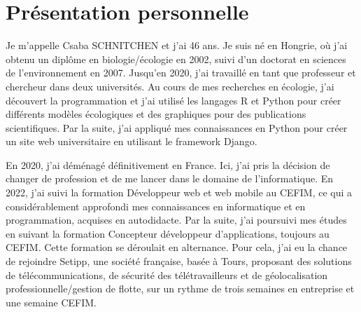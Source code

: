 \section{Présentation personnelle}\label{sec:presentation-personnelle}


Je m'appelle Csaba SCHNITCHEN et j'ai 46 ans. Je suis né en Hongrie, où j'ai obtenu un diplôme en biologie/écologie en 2002, suivi d'un doctorat en sciences de l'environnement en 2007. Jusqu'en 2020, j'ai travaillé en tant que professeur et chercheur dans deux universités. Au cours de mes recherches en écologie, j'ai découvert la programmation et j'ai utilisé les langages R et Python pour créer différents modèles écologiques et des graphiques pour des publications scientifiques. Par la suite, j'ai appliqué mes connaissances en Python pour créer un site web universitaire en utilisant le framework Django.

En 2020, j'ai déménagé définitivement en France. Ici, j'ai pris la décision de changer de profession et de me lancer dans le domaine de l'informatique. En 2022, j'ai suivi la formation Développeur web et web mobile au CEFIM, ce qui a considérablement approfondi mes connaissances en informatique et en programmation, acquises en autodidacte. Par la suite, j'ai poursuivi mes études en suivant la formation Concepteur développeur d'applications, toujours au CEFIM. Cette formation se déroulait en alternance. Pour cela, j'ai eu la chance de rejoindre Setipp, une société française, basée à Tours, proposant des solutions de télécommunications, de sécurité des télétravailleurs et de géolocalisation professionnelle/gestion de flotte, sur un rythme de trois semaines en entreprise et une semaine CEFIM.